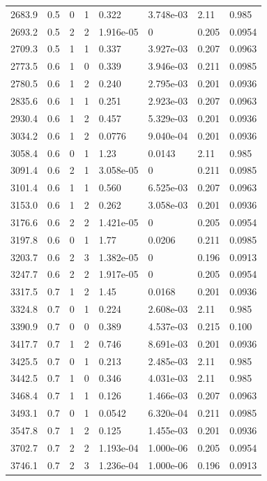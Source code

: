 \documentclass[preview]{standalone}
\begin{document}
{{{\begin{tabular}{L{1.2cm}C{1.2cm} C{0.3cm}C{0.5cm} C{1.4cm}C{1.4cm} C{1.4cm}C{1.4cm}}
  2683.9  &   0.5  & 0     &  1 &  0.322  & 3.748e-03  & 2.11 &  0.985   \\ 
  2693.2  &   0.5  & 2     &  2 &  1.916e-05  & 0  & 0.205 &  0.0954   \\ 
  2709.3  &   0.5  & 1     &  1 &  0.337  & 3.927e-03  & 0.207 &  0.0963   \\ 
  2773.5  &   0.6  & 1     &  0 &  0.339  & 3.946e-03  & 0.211 &  0.0985   \\ 
  2780.5  &   0.6  & 1     &  2 &  0.240  & 2.795e-03  & 0.201 &  0.0936   \\ 
  2835.6  &   0.6  & 1     &  1 &  0.251  & 2.923e-03  & 0.207 &  0.0963   \\ 
  2930.4  &   0.6  & 1     &  2 &  0.457  & 5.329e-03  & 0.201 &  0.0936   \\ 
  3034.2  &   0.6  & 1     &  2 &  0.0776  & 9.040e-04  & 0.201 &  0.0936   \\ 
  3058.4  &   0.6  & 0     &  1 &  1.23  & 0.0143  & 2.11 &  0.985   \\ 
  3091.4  &   0.6  & 2     &  1 &  3.058e-05  & 0  & 0.211 &  0.0985   \\ 
  3101.4  &   0.6  & 1     &  1 &  0.560  & 6.525e-03  & 0.207 &  0.0963   \\ 
  3153.0  &   0.6  & 1     &  2 &  0.262  & 3.058e-03  & 0.201 &  0.0936   \\ 
  3176.6  &   0.6  & 2     &  2 &  1.421e-05  & 0  & 0.205 &  0.0954   \\ 
  3197.8  &   0.6  & 0     &  1 &  1.77  & 0.0206  & 0.211 &  0.0985   \\ 
  3203.7  &   0.6  & 2     &  3 &  1.382e-05  & 0  & 0.196 &  0.0913   \\ 
  3247.7  &   0.6  & 2     &  2 &  1.917e-05  & 0  & 0.205 &  0.0954   \\ 
  3317.5  &   0.7  & 1     &  2 &  1.45  & 0.0168  & 0.201 &  0.0936   \\ 
  3324.8  &   0.7  & 0     &  1 &  0.224  & 2.608e-03  & 2.11 &  0.985   \\ 
  3390.9  &   0.7  & 0     &  0 &  0.389  & 4.537e-03  & 0.215 &  0.100   \\ 
  3417.7  &   0.7  & 1     &  2 &  0.746  & 8.691e-03  & 0.201 &  0.0936   \\ 
  3425.5  &   0.7  & 0     &  1 &  0.213  & 2.485e-03  & 2.11 &  0.985   \\ 
  3442.5  &   0.7  & 1     &  0 &  0.346  & 4.031e-03  & 2.11 &  0.985   \\ 
  3468.4  &   0.7  & 1     &  1 &  0.126  & 1.466e-03  & 0.207 &  0.0963   \\ 
  3493.1  &   0.7  & 0     &  1 &  0.0542  & 6.320e-04  & 0.211 &  0.0985   \\ 
  3547.8  &   0.7  & 1     &  2 &  0.125  & 1.455e-03  & 0.201 &  0.0936   \\ 
  3702.7  &   0.7  & 2     &  2 &  1.193e-04  & 1.000e-06  & 0.205 &  0.0954   \\ 
  3746.1  &   0.7  & 2     &  3 &  1.236e-04  & 1.000e-06  & 0.196 &  0.0913   \\ 
\hline 
\end{tabular} 

}}}
\end{document}
